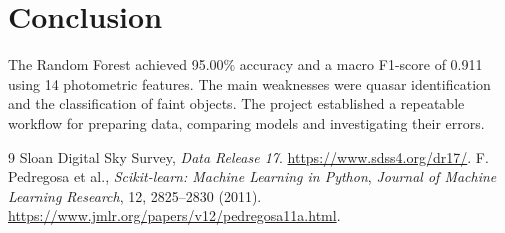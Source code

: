 \documentclass[10pt,a4paper]{article}
\begin{document}
\section{Conclusion}
The Random Forest achieved 95.00\% accuracy and a macro F1-score of 0.911
using 14 photometric features. The main weaknesses were quasar identification
and the classification of faint objects. The project established a repeatable
workflow for preparing data, comparing models and investigating their errors.

\begin{thebibliography}{9}\small
  Sloan Digital Sky Survey, \emph{Data Release 17}.
  \url{https://www.sdss4.org/dr17/}.
  F. Pedregosa et al., \emph{Scikit-learn: Machine Learning in Python},
  \emph{Journal of Machine Learning Research}, 12, 2825--2830 (2011).
  \url{https://www.jmlr.org/papers/v12/pedregosa11a.html}.
\end{thebibliography}
\end{document}
